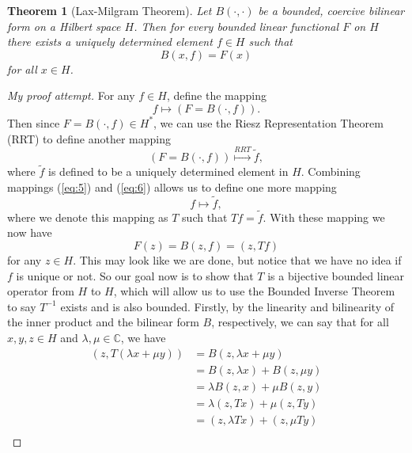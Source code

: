 \documentclass[11pt]{article}
\newtheorem{theorem}{Theorem}
\theoremstyle{definition}
\begin{document}
\begin{theorem}[Lax-Milgram Theorem]
	Let $B(\cdot,\cdot)$ be a bounded, coercive bilinear form on a Hilbert space $H$. Then for every bounded linear functional $F$ on $H$
	there exists a uniquely determined element $f\in H$ such that
	\begin{equation*}
		B(x,f) = F(x)
	\end{equation*}
	for all $x \in H$.
\end{theorem}
\begin{proof}[My proof attempt]
	For any $f \in H$, define the mapping 
	\begin{equation}
		\label{eq:5}
		f \mapsto (F = B(\cdot, f)).
	\end{equation}
	Then since $F = B(\cdot, f) \in H^*$, we can use the Riesz Representation Theorem (RRT) to  define another mapping
	\begin{equation}
		\label{eq:6}
		(F = B(\cdot,f)) \stackrel{RRT}{\mapsto} \tilde{f},
	\end{equation}
	where $\tilde{f}$ is defined to be a uniquely determined element in $H$.
	Combining mappings (\ref{eq:5}) and (\ref{eq:6}) allows us to define one more mapping
	\begin{equation}
		\label{eq:7}
		f \mapsto \tilde{f},
	\end{equation}
	where we denote this mapping as $T$ such that $Tf = \tilde{f}$.
	With these mapping we now have
	\begin{equation*}
		F(z) = B(z,f) = (z,Tf)
	\end{equation*}
	for any $z \in H$.
	This may look like we are done, but notice that we have no idea if $f$ is unique or not.
	So our goal now is to show that $T$ is a bijective bounded linear operator from $H$ to $H$,
	which will allow us to use the Bounded Inverse Theorem to say $T^{-1}$ exists and is also bounded.
	Firstly, by the linearity and bilinearity of the inner product and the bilinear form $B$, respectively,
	we can say that for all $x,y,z \in H$ and $\lambda, \mu \in \mathbb{C}$, we have
	\begin{equation*}
		\begin{aligned}
			(z,T(\lambda x + \mu y)) &= B(z, \lambda x + \mu y) \\
						 &= B(z,\lambda x) + B(z, \mu y) \\
						 &= \lambda B(z,x) + \mu B(z,y) \\
						 &= \lambda (z,Tx) + \mu (z,Ty) \\
						 &= (z,\lambda Tx) + (z, \mu Ty) \\

\end{aligned}
\end{equation*}
\end{proof}
\end{document}
